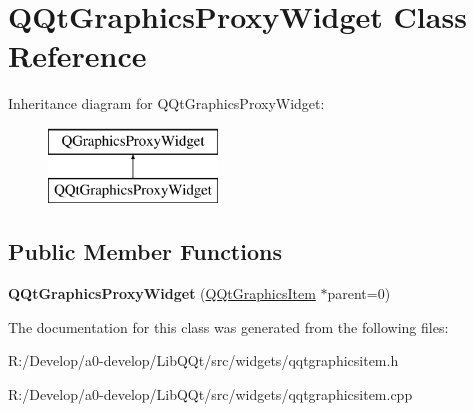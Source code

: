 \hypertarget{class_q_qt_graphics_proxy_widget}{}\section{Q\+Qt\+Graphics\+Proxy\+Widget Class Reference}
\label{class_q_qt_graphics_proxy_widget}
Inheritance diagram for Q\+Qt\+Graphics\+Proxy\+Widget\+:\begin{figure}[H]
\begin{center}
\leavevmode
\includegraphics[height=2.000000cm]{class_q_qt_graphics_proxy_widget}
\end{center}
\end{figure}
\subsection*{Public Member Functions}
\begin{DoxyCompactItemize}
\item 
\mbox{\label{class_q_qt_graphics_proxy_widget_a4021aa8b195a40a403ba1dba7f421561}} 
{\bfseries Q\+Qt\+Graphics\+Proxy\+Widget} (\mbox{\hyperlink{class_q_qt_graphics_item}{Q\+Qt\+Graphics\+Item}} $\ast$parent=0)
\end{DoxyCompactItemize}


The documentation for this class was generated from the following files\+:\begin{DoxyCompactItemize}
\item 
R\+:/\+Develop/a0-\/develop/\+Lib\+Q\+Qt/src/widgets/qqtgraphicsitem.\+h\item 
R\+:/\+Develop/a0-\/develop/\+Lib\+Q\+Qt/src/widgets/qqtgraphicsitem.\+cpp\end{DoxyCompactItemize}
